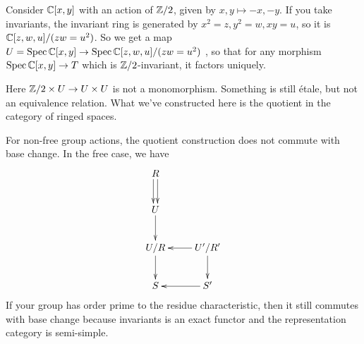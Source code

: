  \begin{example}
   Consider $\mathbb{C}[x,y]$ with an action of $\mathbb{Z}/2$, given by $x,y\mapsto -x,-y$. If you
   take invariants, the invariant ring is generated by $x^2=z,y^2=w,xy=u$, so it is
   $\mathbb{C}[z,w,u]/(zw=u^2)$. So we get a map $U=\operatorname{Spec} \mathbb{C}[x,y] \to \operatorname{Spec} \mathbb{C}[z,w,u]/(zw=u^2)$
   , so that for any morphism $\operatorname{Spec} \mathbb{C}[x,y]\to T$ which is
   $\mathbb{Z}/2$-invariant, it factors uniquely.

   Here $\mathbb{Z}/2\times U\to U\times U$ is not a monomorphism. Something is still \'etale,
   but not an equivalence relation. What we've constructed here is the quotient in the
   category of ringed spaces.
 \end{example}
 \begin{remark}
   For non-free group actions, the quotient construction does not commute with base
   change. In the free case, we have
   \[\xymatrix{
    R\ar@<.5ex>[d] \ar@<-.5ex>[d] \\
    U\ar[d]\\
    U/R \ar[d] & U'/R' \ar[l] \ar[d]\\
    S & S'\ar[l]
   }\]
   If your group has order prime to the residue characteristic, then it still commutes
   with base change because invariants is an exact functor and the representation
   category is semi-simple.
 \end{remark}

